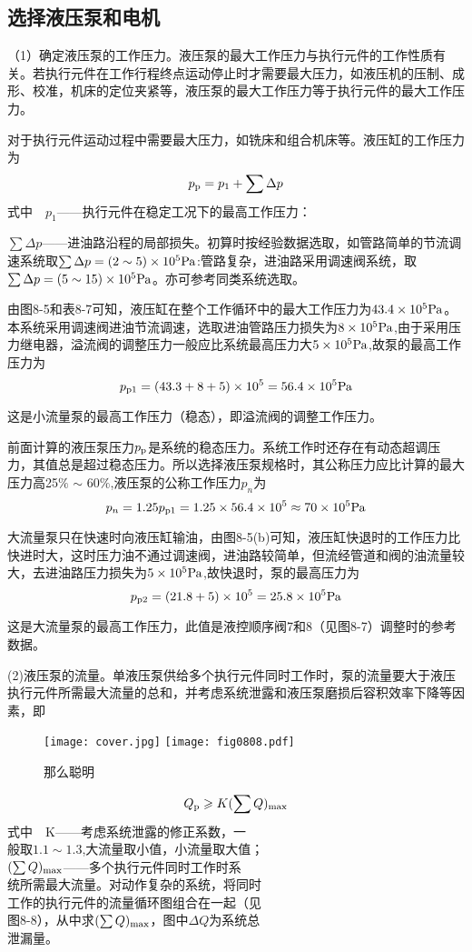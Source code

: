 \subsection{选择液压泵和电机}
（1）确定液压泵的工作压力。液压泵的最大工作压力与执行元件的工作性质有关。若执行元件在工作行程终点运动停止时才需要最大压力，如液压机的压制、成形、校准，机床的定位夹紧等，液压泵的最大工作压力等于执行元件的最大工作压力。

对于执行元件运动过程中需要最大压力，如铣床和组合机床等。液压缸的工作压力为
\begin{equation}
p_{\rm p}=p_1+\sum\Delta p 
\end{equation}
式中$\quad p_1$——执行元件在稳定工况下的最高工作压力：

$\sum\Delta p$——进油路沿程的局部损失。初算时按经验数据选取，如管路简单的节流调速系统取$\sum\Delta p=(2\sim5)\times10^5{\rm Pa}$:管路复杂，进油路采用调速阀系统，取$\sum\Delta p=(5\sim15) \times 10^5{\rm Pa}$。亦可参考同类系统选取。

由图8-5和表8-7可知，液压缸在整个工作循环中的最大工作压力为$43.4\times10^5{\rm Pa}$。本系统采用调速阀进油节流调速，选取进油管路压力损失为$8\times10^5{\rm Pa}$,由于采用压力继电器，溢流阀的调整压力一般应比系统最高压力大$5\times10^5{\rm Pa}$,故泵的最高工作压力为
$$p_{\rm p1}=(43.3+8+5)\times10^5=56.4\times10^5{\rm Pa}$$

这是小流量泵的最高工作压力（稳态），即溢流阀的调整工作压力。

前面计算的液压泵压力$p_{\rm p}$是系统的稳态压力。系统工作时还存在有动态超调压力，其值总是超过稳态压力。所以选择液压泵规格时，其公称压力应比计算的最大压力高25$\%$ $\sim$ 60$\%$,液压泵的公称工作压力$p_n$为
$$ p_n=1.25p_{\rm p1}=1.25\times56.4\times10^5\approx70\times10^5{\rm Pa} $$

大流量泵只在快速时向液压缸输油，由图8-5(b)可知，液压缸快退时的工作压力比快进时大，这时压力油不通过调速阀，进油路较简单，但流经管道和阀的油流量较大，去进油路压力损失为$5\times10^5{\rm Pa}$,故快退时，泵的最高压力为
$$ p_{\rm p2}=(21.8+5)\times10^5=25.8\times10^5{\rm Pa} $$

这是大流量泵的最高工作压力，此值是液控顺序阀7和8（见图8-7）调整时的参考数据。

(2)液压泵的流量。单液压泵供给多个执行元件同时工作时，泵的流量要大于液压执行元件所需最大流量的总和，并考虑系统泄露和液压泵磨损后容积效率下降等因素，即
\begin{figure}
\centering
\ifOpenSource
\texttt{[image: cover.jpg]}
\else
\texttt{[image: fig0808.pdf]}
\fi
\caption{那么聪明}
\label{fig:fig0808}
\end{figure}
\begin{equation}
    Q_{\rm p}\geqslant K(\sum Q)_{\rm max}
\end{equation}
式中$\quad$K——考虑系统泄露的修正系数，一\\般取$1.1\sim1.3$,大流量取小值，小流量取大值；\\$(\sum Q)_{\rm max}$——多个执行元件同时工作时系\\统所需最大流量。对动作复杂的系统，将同时\\工作的执行元件的流量循环图组合在一起（见\\图8-8），从中求$(\sum Q)_{\rm max}$，图中$\Delta Q$为系统总\\泄漏量。

